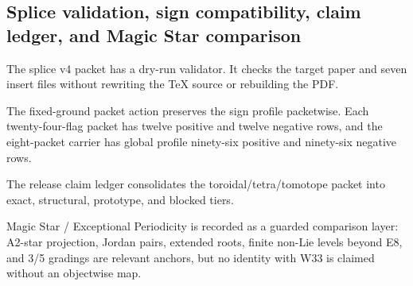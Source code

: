 \subsection{Splice validation, sign compatibility, claim ledger, and Magic Star comparison}
\label{sec:bt1536-bt1539-splice-sign-claim-magic}

The splice v4 packet has a dry-run validator.  It checks the target paper and seven insert files without rewriting the TeX source or rebuilding the PDF.

The fixed-ground packet action preserves the sign profile packetwise.  Each twenty-four-flag packet has twelve positive and twelve negative rows, and the eight-packet carrier has global profile ninety-six positive and ninety-six negative rows.

The release claim ledger consolidates the toroidal/tetra/tomotope packet into exact, structural, prototype, and blocked tiers.

Magic Star / Exceptional Periodicity is recorded as a guarded comparison layer: A2-star projection, Jordan pairs, extended roots, finite non-Lie levels beyond E8, and 3/5 gradings are relevant anchors, but no identity with W33 is claimed without an objectwise map.

